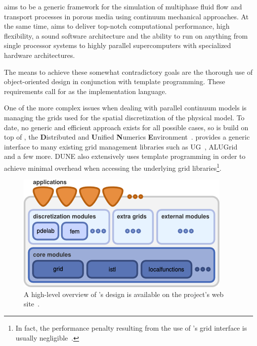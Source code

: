 \Dumux aims to be a generic framework for the simulation of multiphase
fluid flow and transport processes in porous media using continuum
mechanical approaches.  At the same time, \Dumux aims to deliver
top-notch computational performance, high flexibility, a sound
software architecture and the ability to run on anything from single
processor systems to highly parallel supercomputers with specialized
hardware architectures.

The means to achieve these somewhat contradictory goals are the
thorough use of object-oriented design in conjunction with template
programming. These requirements call for \Cplusplus as the implementation
language.

One of the more complex issues when dealing with parallel continuum
models is managing the grids used for the spatial discretization of
the physical model. To date, no generic and efficient approach exists
for all possible cases, so \Dumux is build on top of \Dune, the
\textbf{D}istributed and \textbf{U}nified \textbf{N}umerics
\textbf{E}nvironment~\cite{DUNE-HP}. \Dune provides a generic interface
to many existing grid management libraries such as UG~\cite{UG-HP},
ALUGrid~\cite{ALUGRID-HP,alugrid2016} and a few more.
DUNE also extensively uses template programming in order to
achieve minimal overhead when accessing the underlying grid
libraries\footnote{In fact, the performance penalty resulting from the
use of \Dune's grid interface is usually negligible~\cite{BURRI2006}.}.
\begin{figure}[hbt]
  \centering
  \includegraphics[width=.5\linewidth, keepaspectratio]{png/dunedesign.png}
  \caption{
    \label{fig:dune-design}
    A high-level overview of \Dune's design is available on the project's
    web site~\cite{DUNE-HP}.
  }
\end{figure}


